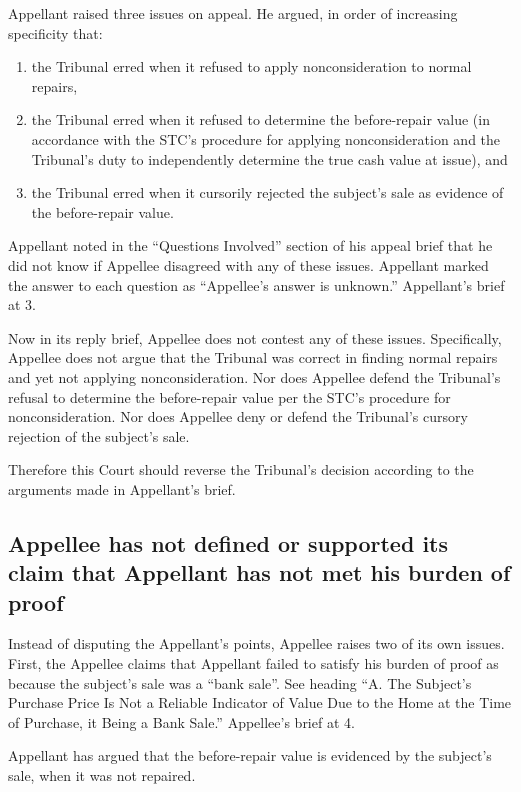 \documentclass[12pt,\documentclassflag]{michiganCourtOfAppealsBrief}
\begin{document}
Appellant raised three issues on appeal. He argued, in order of increasing specificity that:

\begin{enumerate}
\item the Tribunal erred when it refused to apply nonconsideration to normal repairs,
\item the Tribunal erred when it refused to determine the before-repair value (in accordance with the STC's procedure for applying nonconsideration and the Tribunal's duty to independently determine the true cash value at issue), and
\item the Tribunal erred when it cursorily rejected the subject's sale as evidence of the before-repair value.
\end{enumerate}


Appellant noted in the ``Questions Involved'' section of his appeal brief that he did not know if Appellee disagreed with any of these issues. Appellant marked the answer to each question as ``Appellee's answer is unknown.'' Appellant's brief at 3.

Now in its reply brief, Appellee does not contest any of these issues. Specifically, Appellee does not argue that the Tribunal was correct in finding normal repairs and yet not applying nonconsideration. Nor does Appellee defend the Tribunal's refusal to determine the before-repair value per the STC's procedure for nonconsideration. Nor does Appellee deny or defend the Tribunal's cursory rejection of the subject's sale.

Therefore this Court should reverse the Tribunal's decision according to the arguments made in Appellant's brief.

\subsection{Appellee has not defined or supported its claim that Appellant has not met his burden of proof}
 
Instead of disputing the Appellant's points, Appellee raises two of its own issues. First, the Appellee claims that Appellant failed to satisfy his burden of proof as because the subject's sale was a ``bank sale''.
See heading ``A.  The Subject's Purchase Price Is Not a Reliable Indicator of Value Due to the Home at the Time of Purchase, it Being a Bank Sale.'' Appellee's brief at 4.

Appellant has argued that the before-repair value is evidenced by the subject's sale, when it was not repaired.
\end{document}
